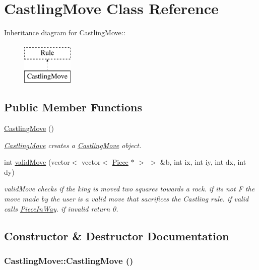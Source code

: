 \hypertarget{classCastlingMove}{
\section{CastlingMove Class Reference}
\label{classCastlingMove}
}
Inheritance diagram for CastlingMove::\begin{figure}[H]
\begin{center}
\leavevmode
\includegraphics[height=2cm]{classCastlingMove}
\end{center}
\end{figure}
\subsection*{Public Member Functions}
\begin{DoxyCompactItemize}
\item 
\hyperlink{classCastlingMove_ac2b171638597ff26944c2426c35768de}{CastlingMove} ()
\begin{DoxyCompactList}\small\item\em \hyperlink{classCastlingMove}{CastlingMove} creates a \hyperlink{classCastlingMove}{CastlingMove} object. \item\end{DoxyCompactList}\item 
int \hyperlink{classCastlingMove_ad716f6021188a950d53b824bcdfdcb0d}{validMove} (vector$<$ vector$<$ \hyperlink{classPiece}{Piece} $\ast$ $>$ $>$ \&b, int ix, int iy, int dx, int dy)
\begin{DoxyCompactList}\small\item\em validMove checks if the king is moved two squares towards a rock. if its not F the move made by the user is a valid move that sacrifices the Castling rule. if valid calls \hyperlink{classPieceInWay}{PieceInWay}. if invalid return 0. \item\end{DoxyCompactList}\end{DoxyCompactItemize}


\subsection{Constructor \& Destructor Documentation}
\hypertarget{classCastlingMove_ac2b171638597ff26944c2426c35768de}{
\subsubsection[{CastlingMove}]{\setlength{\rightskip}{0pt plus 5cm}CastlingMove::CastlingMove ()}}
\label{classCastlingMove_ac2b171638597ff26944c2426c35768de}


